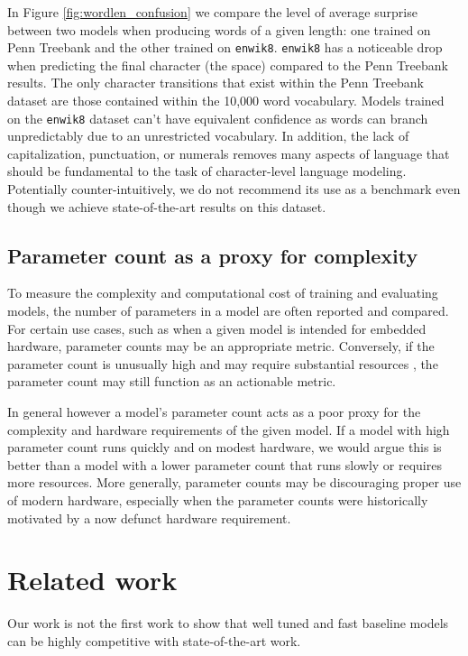 \documentclass{article}
\newcommand{\enwik}{\texttt{enwik8}\xspace}
\begin{document}
In Figure \ref{fig:wordlen_confusion} we compare the level of average surprise between two models when producing words of a given length: one trained on Penn Treebank and the other trained on \enwik.
\enwik has a noticeable drop when predicting the final character (the space) compared to the Penn Treebank results.
The only character transitions that exist within the Penn Treebank dataset are those contained within the 10,000 word vocabulary.
Models trained on the \enwik dataset can't have equivalent confidence as words can branch unpredictably due to an unrestricted vocabulary.
In addition, the lack of capitalization, punctuation, or numerals removes many aspects of language that should be fundamental to the task of character-level language modeling.
Potentially counter-intuitively, we do not recommend its use as a benchmark even though we achieve state-of-the-art results on this dataset.

\subsection{Parameter count as a proxy for complexity}

To measure the complexity and computational cost of training and evaluating models, the number of parameters in a model are often reported and compared.
For certain use cases, such as when a given model is intended for embedded hardware, parameter counts may be an appropriate metric.
Conversely, if the parameter count is unusually high and may require substantial resources \citep{Shazeer2017}, the parameter count may still function as an actionable metric.

In general however a model's parameter count acts as a poor proxy for the complexity and hardware requirements of the given model.
If a model with high parameter count runs quickly and on modest hardware, we would argue this is better than a model with a lower parameter count that runs slowly or requires more resources.
More generally, parameter counts may be discouraging proper use of modern hardware, especially when the parameter counts were historically motivated by a now defunct hardware requirement.

\section{Related work}

Our work is not the first work to show that well tuned and fast baseline models can be highly competitive with state-of-the-art work.
\end{document}
